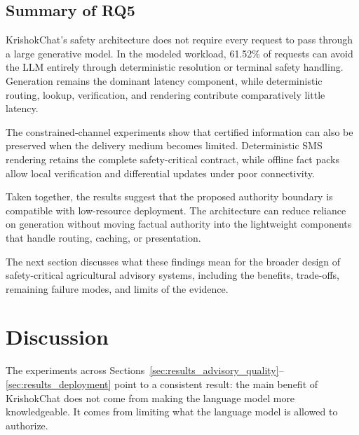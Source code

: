 \documentclass[a4paper,fleqn]{cas-dc}
\begin{document}
\subsection{Summary of RQ5}

KrishokChat's safety architecture does not require every request to pass through a large generative model. In the modeled workload, 61.52\% of requests can avoid the LLM entirely through deterministic resolution or terminal safety handling. Generation remains the dominant latency component, while deterministic routing, lookup, verification, and rendering contribute comparatively little latency.

The constrained-channel experiments show that certified information can also be preserved when the delivery medium becomes limited. Deterministic SMS rendering retains the complete safety-critical contract, while offline fact packs allow local verification and differential updates under poor connectivity.

Taken together, the results suggest that the proposed authority boundary is compatible with low-resource deployment. The architecture can reduce reliance on generation without moving factual authority into the lightweight components that handle routing, caching, or presentation.

The next section discusses what these findings mean for the broader design of safety-critical agricultural advisory systems, including the benefits, trade-offs, remaining failure modes, and limits of the evidence.


\section{Discussion}
\label{sec:discussion}

The experiments across Sections~\ref{sec:results_advisory_quality}--\ref{sec:results_deployment} point to a consistent result: the main benefit of KrishokChat does not come from making the language model more knowledgeable. It comes from limiting what the language model is allowed to authorize.
\end{document}
